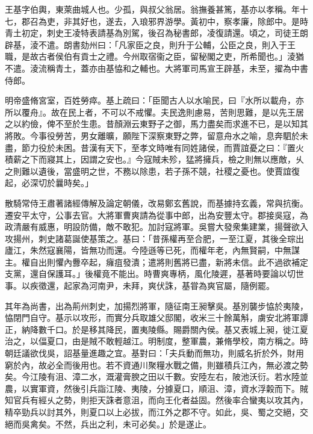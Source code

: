 \begin{pinyinscope}
 
 
 王基字伯輿，東萊曲城人也。少孤，與叔父翁居。翁撫養甚篤，基亦以孝稱。年十七，郡召為吏，非其好也，遂去，入琅邪界游學。黃初中，察孝廉，除郎中。是時青土初定，刺史王凌特表請基為別駕，後召為秘書郎，凌復請還。頃之，司徒王朗辟基，淩不遣。朗書劾州曰：「凡家臣之良，則升于公輔，公臣之良，則入于王職，是故古者侯伯有貢士之禮。今州取宿衞之臣，留秘閣之吏，所希聞也。」淩猶不遣。淩流稱青土，蓋亦由基恊和之輔也。大將軍司馬宣王辟基，未至，擢為中書侍郎。
 
 
 
 
 明帝盛脩宮室，百姓勞瘁。基上疏曰：「臣聞古人以水喻民，曰『水所以載舟，亦所以覆舟』。故在民上者，不可以不戒懼。夫民逸則慮易，苦則思難，是以先王居之以約儉，俾不至於生患。昔顏淵云東野子之御，馬力盡矣而求進不已，是以知其將敗。今事役勞苦，男女離曠，願陛下深察東野之弊，留意舟水之喻，息奔駟於未盡，節力役於未困。昔漢有天下，至孝文時唯有同姓諸侯，而賈誼憂之曰：『置火積薪之下而寢其上，因謂之安也。』今寇賊未殄，猛將擁兵，檢之則無以應敵，乆之則難以遺後，當盛明之世，不務以除患，若子孫不競，社稷之憂也。使賈誼復起，必深切於曩時矣。」
 
 
 
 
 散騎常侍王肅著諸經傳解及論定朝儀，改易鄭玄舊說，而基據持玄義，常與抗衡。遷安平太守，公事去官。大將軍曹爽請為從事中郎，出為安豐太守。郡接吳寇，為政清嚴有威惠，明設防備，敵不敢犯。加討寇將軍。吳嘗大發衆集建業，揚聲欲入攻揚州，刺史諸葛誕使基策之。基曰：「昔孫權再至合肥，一至江夏，其後全琮出廬江，朱然寇襄陽，皆無功而還。今陸遜等已死，而權年老，內無賢嗣，中無謀主。權自出則懼內釁卒起，癕疽發潰；遣將則舊將已盡，新將未信。此不過欲補定支黨，還自保護耳。」後權竟不能出。時曹爽專柄，風化陵遲，基著時要論以切世事。以疾徵還，起家為河南尹，未拜，爽伏誅，基甞為爽官屬，隨例罷。
 
 
 
 
 其年為尚書，出為荊州刺史，加揚烈將軍，隨征南王昶擊吳。基別襲步恊於夷陵，恊閉門自守。基示以攻形，而實分兵取雄父邸閣，收米三十餘萬斛，虜安北將軍譚正，納降數千口。於是移其降民，置夷陵縣。賜爵關內侯。基又表城上昶，徙江夏治之，以偪夏口，由是賊不敢輕越江。明制度，整軍農，兼脩學校，南方稱之。時朝廷議欲伐吳，詔基量進趣之宜。基對曰：「夫兵動而無功，則威名折於外，財用窮於內，故必全而後用也。若不資通川聚糧水戰之備，則雖積兵江內，無必渡之勢矣。今江陵有沮、漳二水，溉灌膏腴之田以千數。安陸左右，陂池沃衍。若水陸並農，以實軍資，然後引兵詣江陵、夷陵，分據夏口，順沮、漳，資水浮糓而下。賊知官兵有經乆之勢，則拒天誅者意沮，而向王化者益固。然後率合蠻夷以攻其內，精卒勁兵以討其外，則夏口以上必拔，而江外之郡不守。如此，吳、蜀之交絕，交絕而吳禽矣。不然，兵出之利，未可必矣。」於是遂止。
 

\end{pinyinscope}
